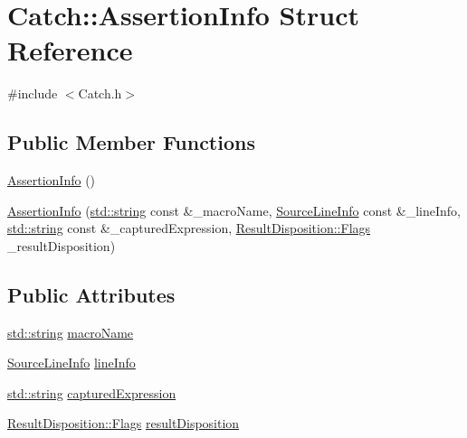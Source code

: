 \hypertarget{struct_catch_1_1_assertion_info}{}\section{Catch\+:\+:Assertion\+Info Struct Reference}
\label{struct_catch_1_1_assertion_info}


{\ttfamily \#include $<$Catch.\+h$>$}

\subsection*{Public Member Functions}
\begin{DoxyCompactItemize}
\item 
\hyperlink{struct_catch_1_1_assertion_info_a15c29d306c86361f842a0351a6003b9f}{Assertion\+Info} ()
\item 
\hyperlink{struct_catch_1_1_assertion_info_aaf6cc3eebd40391e54d37ed42953c73f}{Assertion\+Info} (\hyperlink{_s_d_l__opengl__glext_8h_ae84541b4f3d8e1ea24ec0f466a8c568b}{std\+::string} const \&\+\_\+macro\+Name, \hyperlink{struct_catch_1_1_source_line_info}{Source\+Line\+Info} const \&\+\_\+line\+Info, \hyperlink{_s_d_l__opengl__glext_8h_ae84541b4f3d8e1ea24ec0f466a8c568b}{std\+::string} const \&\+\_\+captured\+Expression, \hyperlink{struct_catch_1_1_result_disposition_a3396cad6e2259af326b3aae93e23e9d8}{Result\+Disposition\+::\+Flags} \+\_\+result\+Disposition)
\end{DoxyCompactItemize}
\subsection*{Public Attributes}
\begin{DoxyCompactItemize}
\item 
\hyperlink{_s_d_l__opengl__glext_8h_ae84541b4f3d8e1ea24ec0f466a8c568b}{std\+::string} \hyperlink{struct_catch_1_1_assertion_info_ac2e59e8c89e00eb3390768f50d540b18}{macro\+Name}
\item 
\hyperlink{struct_catch_1_1_source_line_info}{Source\+Line\+Info} \hyperlink{struct_catch_1_1_assertion_info_a17bdbb404ba12658034f833be2f4c3e7}{line\+Info}
\item 
\hyperlink{_s_d_l__opengl__glext_8h_ae84541b4f3d8e1ea24ec0f466a8c568b}{std\+::string} \hyperlink{struct_catch_1_1_assertion_info_af7c1d3cbfa346e9a303030fa0ef0cb54}{captured\+Expression}
\item 
\hyperlink{struct_catch_1_1_result_disposition_a3396cad6e2259af326b3aae93e23e9d8}{Result\+Disposition\+::\+Flags} \hyperlink{struct_catch_1_1_assertion_info_a60353b3632ab2f827162f2b2d6911073}{result\+Disposition}
\end{DoxyCompactItemize}


